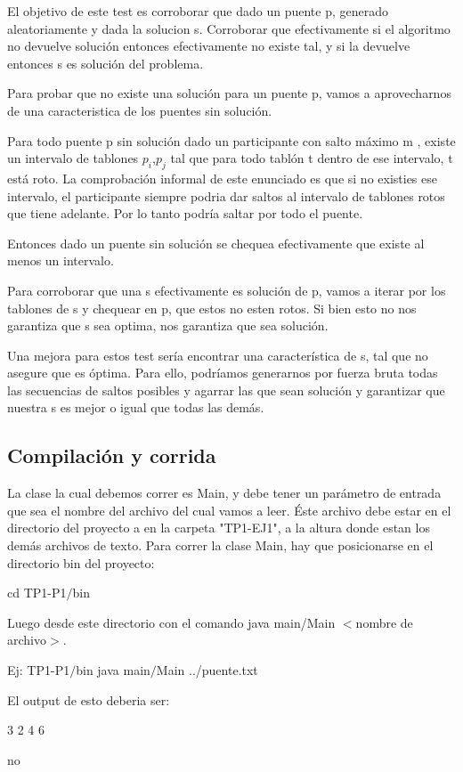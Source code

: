 El objetivo de este test es corroborar que dado un puente p, generado aleatoriamente y dada la solucion s. Corroborar que efectivamente si el algoritmo no devuelve soluci\'on entonces efectivamente no existe tal, y si la devuelve entonces s es soluci\'on del problema.

Para probar que no existe una soluci\'on para un puente p, vamos a aprovecharnos de una caracteristica de los puentes sin soluci\'on.

Para todo puente p sin soluci\'on dado un participante con salto m\'aximo m , existe un intervalo de tablones $p_{i}$,$p_{j}$ tal que para todo tabl\'on t dentro de ese intervalo, t est\'a roto.
La comprobaci\'on informal de este enunciado es que si no existies ese intervalo, el participante siempre podria dar saltos al intervalo de tablones rotos que tiene adelante. Por lo tanto podr\'ia saltar por todo el puente.

Entonces dado un puente sin soluci\'on se chequea efectivamente que existe al menos un intervalo.

Para corroborar que una s efectivamente es soluci\'on de p, vamos a iterar por los tablones de s y chequear en p, que estos no esten rotos.
Si bien esto no nos garantiza que s sea optima, nos garantiza que sea soluci\'on.

Una mejora para estos test ser\'ia encontrar una caracter\'istica de s, tal que no asegure que es \'optima. Para ello, podr\'iamos generarnos por fuerza bruta todas las secuencias de saltos posibles y agarrar las que sean soluci\'on y garantizar que nuestra s es mejor o igual que todas las dem\'as.

\subsection{Compilaci\'on y corrida}


La clase la cual debemos correr es Main, y debe tener un par\'ametro de entrada que sea el nombre del archivo del cual vamos a leer. \'Este archivo debe estar en el directorio del proyecto a en la carpeta "TP1-EJ1", a la altura donde estan los dem\'as archivos de texto.
Para correr la clase Main, hay que posicionarse en el directorio bin del proyecto:

cd TP1-P1$/$bin

Luego desde este directorio con el comando java main/Main $<$nombre de archivo$>$.

Ej: TP1-P1$/$bin java main$/$Main ../puente.txt

El output de esto deberia ser: 

3 2 4 6

no

 